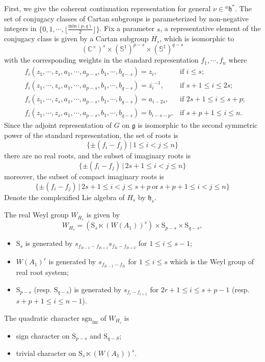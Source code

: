\documentclass[12pt, a4paper]{amsart}
\numberwithin{equation}{section}
\newcommand{\BC}{{\mathbb {C}}}
\newcommand{\BS}{{\mathbb {S}}}
\newcommand{\fg}{\mathfrak{g}}
\newcommand{\fh}{\mathfrak{h}}
\newcommand{\sgn}{{\mathrm{sgn}}}
\newcommand{\set}[2]{\{#1\,|\,#2\}}
\renewcommand{\bar}{\overline}
\begin{document}
First, we give the coherent continuation representation for general $\nu \in {^{a}\fh^*}$. The set of conjugacy classes of Cartan subgroups is parameterized by non-negative integers in $\{0,1,\cdots,\lfloor\frac{\mathrm{min}(p,q)}{2}\rfloor\}$. Fix a parameter $s$, a representative element of the conjugacy class is given by a Cartan subgroup $H_s$, which is isomorphic to 
$$(\BC^{\times})^s \times (\BS^1)^{p-s} \times (\BS^1)^{q-s}$$
with the corresponding weights in the standard representation $f_1,\cdots,f_n$ where
\begin{align}
    & f_{i}(z_1,\cdots,z_s,a_1,\cdots,a_{p-s},b_1,\cdots,b_{q-s}) = z_i, & \textrm{if $i \leq s$};\\
    & f_{i}(z_1,\cdots,z_s,a_1,\cdots,a_{p-s},b_1,\cdots,b_{q-s}) = \bar{z_i}^{-1}, & \textrm{if $s+1 \leq i \leq 2s$};\\
    &f_i(z_1,\cdots,z_s,a_1,\cdots,a_{p-s},b_1,\cdots,b_{q-s}) = a_{i-2s}, & \textrm{if $2s+1 \leq i \leq s+p$};\\
    &f_i(z_1,\cdots,z_s,a_1,\cdots,a_{p-s},b_1,\cdots,b_{q-s}) = b_{i-s-p}, & \textrm{if $s+p+1 \leq i \leq n$}.
\end{align}
Since the adjoint representation of $G$ on $\fg$ is isomorphic to the second symmetric power of the standard representation, the set of roots is 
$$\set{\pm(f_i-f_j)}{1\leq i <j \leq n}$$
there are no real roots, and the subset of imaginary roots is
$$\set{\pm(f_i-f_j)}{2s+1 \leq i < j \leq n}$$
moreover, the subset of compact imaginary roots is
$$\set{\pm(f_i-f_j)}{2s+1 \leq i < j \leq s+p \  \textrm{or} \ s+p+1 \leq i<j \leq n }$$
Denote the complexified Lie algebra of $H_s$ by $\fh_s$. 

The real Weyl group $W_{H_s}$ is given by
$$W_{H_s} = (\mathrm{S}_s \ltimes  (W(A_1))^s) \times \mathrm{S}_{p-s} \times \mathrm{S}_{q-s},$$

\begin{itemize}
    \item $\mathrm{S}_s$ is generated by $s_{f_{2i-1}-f_{2i+1}}s_{f_{2i}-f_{2i+2}}$ for $1 \leq i \leq s-1$;
    \item $W(A_1)^r$ is generated by $s_{f_{2i-1}-f_{2i}}$ for $1 \leq i \leq s$ which is the Weyl group of real root system;
    \item $\mathrm{S}_{p-s}$ (resp. $\mathrm{S}_{q-s}$) is generated by $s_{f_{i}-f_{i+1}}$ for $2r+1 \leq i \leq s+p-1$ (resp. $s+p+1 \leq i \leq n-1$).
\end{itemize}

The quadratic character $\sgn_{\mathrm{im}}$ of $W_{H_{s}}$ is
\begin{itemize}
    \item sign character on $\mathrm{S}_{p-s}$ and $\mathrm{S}_{q-S}$;
    \item trivial character on $\mathrm{S}_s \ltimes  (W(A_1))^s$.
\end{itemize}
\end{document}
